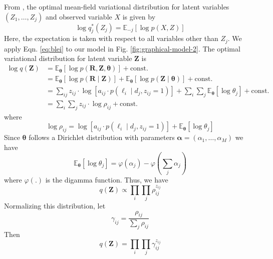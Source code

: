 From \cite{Blei2017}, the optimal mean-field variational distribution for latent variables $\left(Z_{1}, \ldots, Z_{j}\right)$ and observed variable $X$ is given by
\begin{equation}
    \log q_{j}^{*}\left(Z_{j}\right)=\mathbb{E}_{-j}[\log p(X, Z)]\label{eq:blei}
\end{equation}
\noindent Here, the expectation is taken with respect to all variables other than $Z_j$. We apply Eqn. \ref{eq:blei} to our model in Fig. \ref{fig:graphical-model-2}. The optimal variational distribution for latent variable $\boldsymbol{Z}$ is
\begin{equation}
\begin{split}
    \log q(\boldsymbol{Z}) &=\mathbb{E}_{\boldsymbol{\theta}}\left[\log p(\boldsymbol{R}, \boldsymbol{Z}, \boldsymbol{\theta})\right]+\mathrm{ const. } \\
    &=\mathbb{E}_{\boldsymbol{\theta}}[\log p(\boldsymbol{R} \mid \boldsymbol{Z})]+\mathbb{E}_{\boldsymbol{\theta}}[\log p(\boldsymbol{Z} \mid \boldsymbol{\theta})]+\mathrm{ const. } \\
    &=\sum_{i j} z_{i j} \cdot \log \left[a_{i j} \cdot p\left(\ell_{i} \mid d_{j}, z_{i j}=1\right)\right]+\sum_{i}\sum_{ j}\mathbb{E}_{\boldsymbol{\theta}}\left[\log \theta_{j}\right]+\mathrm{ const. } \\
    &=\sum_{i} \sum_{j} z_{i j} \cdot \log \rho_{i j}+\mathrm{ const. }
\end{split}
\end{equation}
where 
\begin{equation}
        \log \rho_{i j} =\log \left[a_{i j} \cdot p\left(\ell_{i} \mid d_{j}, z_{ij}=1\right)\right]+\mathbb{E}_{\boldsymbol{\theta}}\left[\log \theta_{j}\right]
\end{equation}
Since $\boldsymbol{\theta}$ follows a Dirichlet distribution with parameters $\boldsymbol{\alpha}=\left(\alpha_{1}, \ldots, \alpha_{M}\right)$ we have
\begin{equation}
    \mathbb{E}_{\boldsymbol{\theta}}\left[\log \theta_{j}\right]=\varphi\left(\alpha_{j}\right)-\varphi\left(\sum_{j} \alpha_{j}\right)
\end{equation}
where $\varphi(.)$ is the digamma function. Thus, we have
\begin{equation}
    q(\bm{Z})\propto\prod_i\prod_j\rho_{ij}^{z_{ij}}
\end{equation}
Normalizing this distribution, let
\begin{equation}
    \gamma_{i j}=\frac{\rho_{i j}}{\sum_{j} \rho_{i j}}
\end{equation}
Then 
\begin{equation}
    q(\boldsymbol{Z})=\prod_{i} \prod_{j} \gamma_{i j}^{z_{i j}}
\end{equation}

